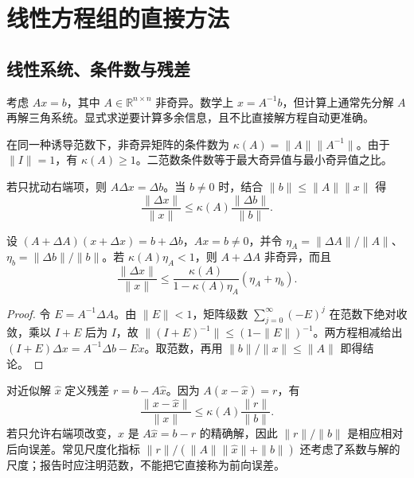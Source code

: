 \setcounter{chapter}{3} %
\chapter{线性方程组的直接方法}
\label{chap:na-direct}

\section{线性系统、条件数与残差}
考虑 $Ax=b$，其中 $A\in\mathbb R^{n\times n}$ 非奇异。数学上 $x=A^{-1}b$，但计算上通常先分解 $A$ 再解三角系统。显式求逆要计算多余信息，且不比直接解方程自动更准确。

\begin{definition}[矩阵条件数]
在同一种诱导范数下，非奇异矩阵的条件数为 $\kappa(A)=\|A\|\|A^{-1}\|$。由于 $\|I\|=1$，有 $\kappa(A)\ge1$。二范数条件数等于最大奇异值与最小奇异值之比。
\end{definition}
若只扰动右端项，则 $A\Delta x=\Delta b$。当 $b\ne0$ 时，结合 $\|b\|\le\|A\|\|x\|$ 得
\begin{equation}
 \frac{\|\Delta x\|}{\|x\|}\le\kappa(A)\frac{\|\Delta b\|}{\|b\|}.
 \label{eq:na-rhs-perturbation}
\end{equation}

\begin{theorem}[系数与右端项同时扰动]
\label{thm:na-linear-perturbation}
设 $(A+\Delta A)(x+\Delta x)=b+\Delta b$，$Ax=b\ne0$，并令 $\eta_A=\|\Delta A\|/\|A\|$、$\eta_b=\|\Delta b\|/\|b\|$。若 $\kappa(A)\eta_A<1$，则 $A+\Delta A$ 非奇异，而且
\[
 \frac{\|\Delta x\|}{\|x\|}\le
 \frac{\kappa(A)}{1-\kappa(A)\eta_A}(\eta_A+\eta_b).
\]
\end{theorem}
\begin{proof}
令 $E=A^{-1}\Delta A$。由 $\|E\|<1$，矩阵级数 $\sum_{j=0}^{\infty}(-E)^j$ 在范数下绝对收敛，乘以 $I+E$ 后为 $I$，故 $\|(I+E)^{-1}\|\le(1-\|E\|)^{-1}$。两方程相减给出 $(I+E)\Delta x=A^{-1}\Delta b-Ex$。取范数，再用 $\|b\|/\|x\|\le\|A\|$ 即得结论。
\end{proof}

对近似解 $\widehat x$ 定义残差 $r=b-A\widehat x$。因为 $A(x-\widehat x)=r$，有
\[
 \frac{\|x-\widehat x\|}{\|x\|}\le\kappa(A)\frac{\|r\|}{\|b\|}.
\]
若只允许右端项改变，$\widehat x$ 是 $A\widehat x=b-r$ 的精确解，因此 $\|r\|/\|b\|$ 是相应相对后向误差。常见尺度化指标 $\|r\|/(\|A\|\|\widehat x\|+\|b\|)$ 还考虑了系数与解的尺度；报告时应注明范数，不能把它直接称为前向误差。

